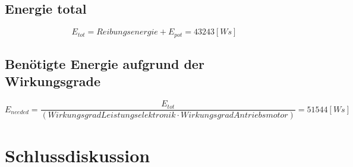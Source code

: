 \documentclass[a4,paper,fleqn]{article}
\begin{document}
\subsection{Energie total}
\[ E_{tot} = Reibungsenergie + E_{pot} = 43243 [Ws]\]

\subsection{Benötigte Energie aufgrund der Wirkungsgrade}
\[ E_{needed} = \frac{E_{tot}}{(Wirkungsgrad Leistungselektronik \cdot Wirkungsgrad Antriebsmotor)} = 51544 [Ws] \]

\section{Schlussdiskussion}

\clearpage
\begin{appendix}

\end{appendix}
\end{document}
